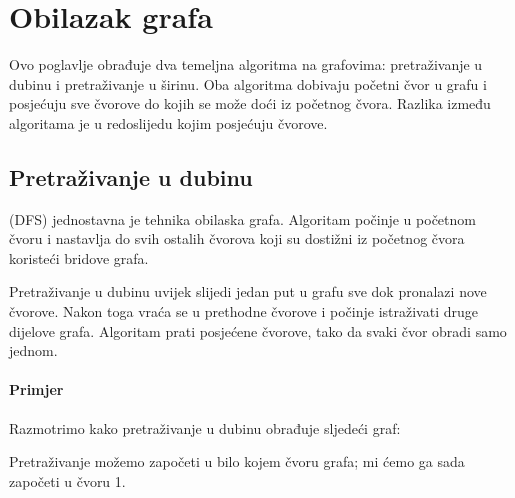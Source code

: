 \chapter{Obilazak grafa}

Ovo poglavlje obrađuje dva temeljna
algoritma na grafovima:
pretraživanje u dubinu i pretraživanje u širinu.
Oba algoritma dobivaju početni
čvor u grafu
i posjećuju sve čvorove do kojih se može doći
iz početnog čvora.
Razlika između algoritama je u redoslijedu
kojim posjećuju čvorove.

\section{Pretraživanje u dubinu}


 (DFS)
jednostavna je tehnika obilaska grafa.
Algoritam počinje u početnom čvoru
i nastavlja do svih ostalih čvorova koji su
dostižni iz početnog čvora
koristeći bridove grafa.

Pretraživanje u dubinu uvijek slijedi jedan
put u grafu sve dok pronalazi
nove čvorove.
Nakon toga vraća se u prethodne
čvorove i počinje istraživati druge dijelove grafa.
Algoritam prati posjećene čvorove,
tako da svaki čvor obradi samo jednom.

\subsubsection*{Primjer}

Razmotrimo kako pretraživanje u dubinu obrađuje
sljedeći graf:
\begin{center}
\end{center}
Pretraživanje možemo započeti u bilo kojem čvoru grafa;
mi ćemo ga sada započeti u čvoru 1.

